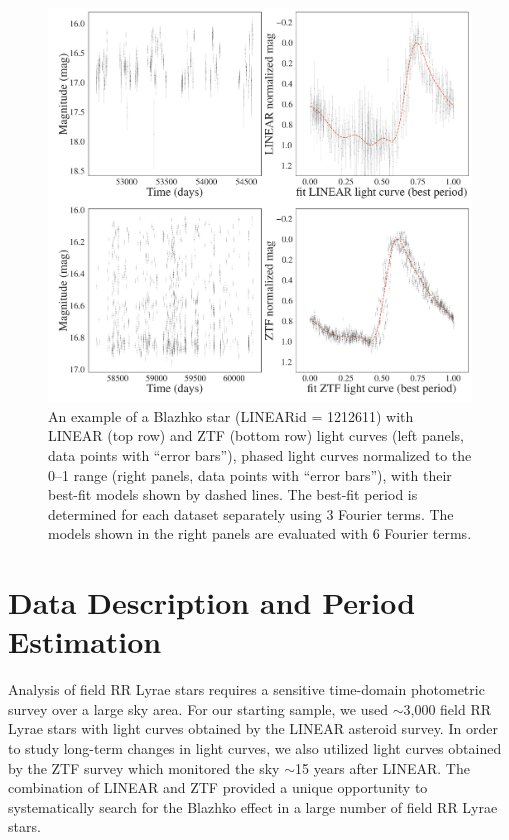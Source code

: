 
\phantom{There is some latex bug somewhere and this dummy call is needed to force it to make pdf...}



\begin{figure}[ht]
  \centering
  \includegraphics[width=18cm]{lc_pair.png}
  \vskip -0.5in
  \caption{An example of a Blazhko star (LINEARid = 1212611) with LINEAR (top row) and ZTF (bottom row) light
    curves (left panels, data points with ``error bars''), phased light curves normalized to the 0--1 range (right panels, data points
    with ``error bars''), with their best-fit models shown by dashed lines. The best-fit period is determined for each
    dataset separately using 3 Fourier terms. The models shown in the right panels are evaluated with 6 Fourier terms. }
 \label{fig:lc_pair}
\end{figure}


\section{Data Description and Period Estimation \label{sec:data}}

Analysis of field RR Lyrae stars requires a sensitive time-domain photometric survey over a large sky area.
For our starting sample, we used $\sim$3,000 field RR Lyrae stars with light curves obtained by the LINEAR
asteroid survey. In order to study long-term changes in light curves, we also utilized light curves obtained
by the ZTF survey which monitored the sky $\sim$15 years after LINEAR. The combination of LINEAR and
ZTF provided a unique opportunity to systematically search for the Blazhko effect in a large number of
field RR Lyrae stars.


